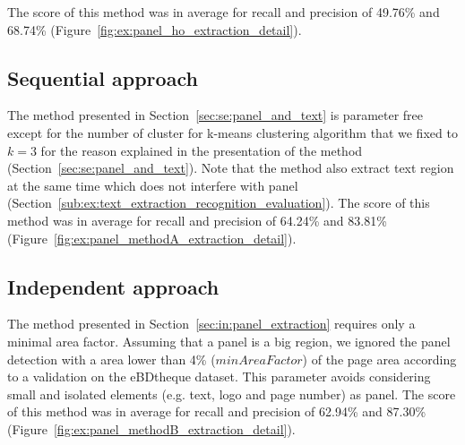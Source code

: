 The score of this method was in average for recall and precision of 49.76\% and 68.74\% (Figure~\ref{fig:ex:panel_ho_extraction_detail}).


\subsection{Sequential approach} %
\label{sub:ex:panel_extraction_rigaud_method_A}

The method presented in Section~\ref{sec:se:panel_and_text} is parameter free except for the number of cluster for k-means clustering algorithm that we fixed to $k=3$ for the reason explained in the presentation of the method (Section~\ref{sec:se:panel_and_text}).
Note that the method also extract text region at the same time which does not interfere with panel (Section~\ref{sub:ex:text_extraction_recognition_evaluation}).
The score of this method was in average for recall and precision of 64.24\% and 83.81\% (Figure~\ref{fig:ex:panel_methodA_extraction_detail}).


\subsection{Independent approach} %
The method presented in Section~\ref{sec:in:panel_extraction} requires only a minimal area factor.
Assuming that a panel is a big region, we ignored the panel detection with a area lower than 4\% ($minAreaFactor$) of the page area according to a validation on the eBDtheque dataset.
This parameter avoids considering small and isolated elements (e.g. text, logo and page number) as panel.
The score of this method was in average for recall and precision of 62.94\% and 87.30\% (Figure~\ref{fig:ex:panel_methodB_extraction_detail}).

